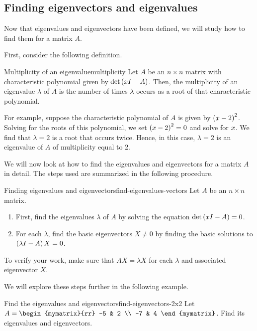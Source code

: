 \subsection{Finding eigenvectors and eigenvalues}

Now that eigenvalues and eigenvectors have been defined, we will study how to find
 them for a matrix $A$. 

First, consider the following definition.

\begin{definition}{Multiplicity of an eigenvalue}{multiplicity}
Let $A$ be an $n \times n$ matrix with characteristic polynomial given by 
$\det \left(x I -  A\right)$. Then, the multiplicity of an eigenvalue $\lambda$ of $A$
is the number of times $\lambda$ occurs as a root of that characteristic polynomial.
\end{definition}

For example, suppose the characteristic polynomial of $A$ is given by
$\left(x - 2 \right)^2$. Solving for the roots of this
polynomial, we set $\left(x - 2 \right)^2 = 0$ and solve for
$x$.  We find that $\lambda = 2$ is a root that occurs
twice. Hence, in this case, $\lambda = 2$ is an eigenvalue of $A$ of
multiplicity equal to $2$.

We will now look at how to find the eigenvalues and eigenvectors for a
matrix $A$ in detail.  The steps used are summarized in the following
procedure.

\begin{procedure}{Finding eigenvalues and eigenvectors}{find-eigenvalues-vectors}
%
Let $A$ be an $n \times n$ matrix. 
\begin{enumerate}
\item First, find the eigenvalues $\lambda$ of $A$ by solving the equation $\det \left(x I -A \right) = 0$. 

\item For each $\lambda$, find the basic eigenvectors $X \neq 0$ by finding the basic solutions to  $\left(\lambda I - A \right) X = 0$.
\end{enumerate}

To verify your work, make sure that $AX=\lambda X$
for each $\lambda$ and associated eigenvector $X$.
\end{procedure}

We will explore these steps further in the following example.

\begin{example}{Find the eigenvalues and eigenvectors}{find-eigenvectors-2x2}
Let $A = \begin{mymatrix}{rr}
-5 & 2 \\
-7 & 4 
\end{mymatrix}$. Find its eigenvalues and eigenvectors. 
\end{example}

